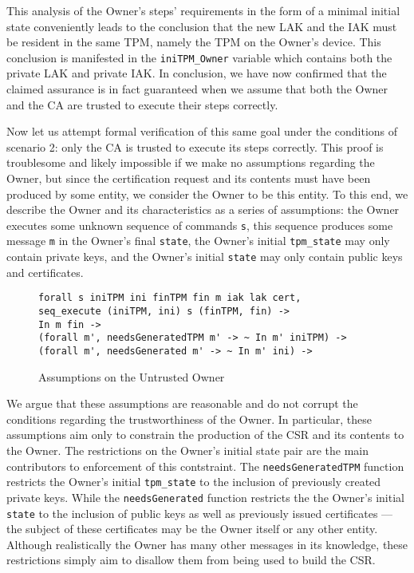 This analysis of the Owner's steps' requirements in the form of a minimal initial state conveniently leads to the conclusion that the new LAK and the IAK must be resident in the same TPM, namely the TPM on the Owner's device. This conclusion is manifested in the \verb|iniTPM_Owner| variable which contains both the private LAK and private IAK. In conclusion, we have now confirmed that the claimed assurance is in fact guaranteed when we assume that both the Owner and the CA are trusted to execute their steps correctly. 

Now let us attempt formal verification of this same goal under the conditions of scenario 2: only the CA is trusted to execute its steps correctly. This proof is troublesome and likely impossible if we make no assumptions regarding the Owner, but since the certification request and its contents must have been produced by some entity, we consider the Owner to be this entity.
To this end, we describe the Owner and its characteristics as a series of assumptions: the Owner executes some unknown sequence of commands \verb|s|, this sequence produces some message \verb|m| in the Owner's final \verb|state|, the Owner's initial \verb|tpm_state| may only contain private keys, and the Owner's initial \verb|state| may only contain public keys and certificates. 
\begin{figure}[h]
\begin{lstlisting}[language=Coq]
forall s iniTPM ini finTPM fin m iak lak cert,
seq_execute (iniTPM, ini) s (finTPM, fin) -> 
In m fin ->
(forall m', needsGeneratedTPM m' -> ~ In m' iniTPM) ->
(forall m', needsGenerated m' -> ~ In m' ini) ->
\end{lstlisting}
\caption{Assumptions on the Untrusted Owner}
\label{fig:owner_assumptions}
\end{figure}
We argue that these assumptions are reasonable and do not corrupt the conditions regarding the trustworthiness of the Owner. In particular, these assumptions aim only to constrain the production of the CSR and its contents to the Owner. 
The restrictions on the Owner's initial state pair are the main contributors to enforcement of this contstraint. The \verb|needsGeneratedTPM| function restricts the Owner's initial \verb|tpm_state| to the inclusion of previously created private keys. While the \verb|needsGenerated| function restricts the the Owner's initial \verb|state| to the inclusion of public keys as well as previously issued certificates --- the subject of these certificates may be the Owner itself or any other entity.
Although realistically the Owner has many other messages in its knowledge, these restrictions simply aim to disallow them from being used to build the CSR.

